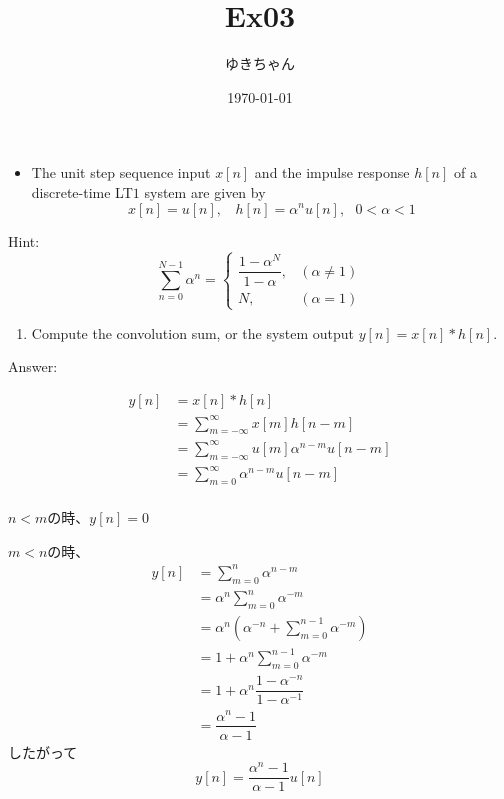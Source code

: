 \documentclass[a4paper,16pt]{jsarticle}
\title{Ex03}
\author{ゆきちゃん}
\date{\today}
\begin{document}
\maketitle

\begin{itemize}
	\item The unit step sequence input $x[n]$ and the impulse response $h[n]$ of a discrete-time LT$1$ system are given by
	\begin{equation}
		x[n] = u[n],~~~~h[n] = \alpha^n u[n],~~~0<\alpha<1
	\end{equation}
\end{itemize}

Hint:
\begin{equation}
	\sum_{n=0}^{N-1} \alpha^n =
	\begin{cases}
		\dfrac{1-\alpha^N}{1-\alpha}, & (\alpha \neq 1) \\
		N, & (\alpha = 1)
	\end{cases}
\end{equation}

\begin{enumerate}
	\item Compute the convolution sum, or the system output $y[n] = x[n]*h[n]$.
\end{enumerate}

Answer:

\begin{align}
	y[n] &= x[n]*h[n] \\
	&= \sum_{m = -\infty}^\infty x[m]h[n-m] \\
	&= \sum_{m = -\infty}^\infty u[m]\alpha^{n-m}u[n-m] \\
	&= \sum_{m = 0}^\infty \alpha^{n-m}u[n-m] \\
\end{align}

$n < m$の時、$y[n] = 0$

$m < n$の時、
\begin{align}
	y[n] &= \sum_{m=0}^{n} \alpha^{n-m} \\
	&= \alpha^n\sum_{m=0}^{n} \alpha^{-m} \\
	&= \alpha^n\left(\alpha^{-n}+\sum_{m=0}^{n-1}\alpha^{-m}\right) \\
	&= 1 + \alpha^n \sum_{m=0}^{n-1}\alpha^{-m} \\
	&= 1 + \alpha^n \dfrac{1-\alpha^{-n}}{1-\alpha^{-1}} \\
	&= \dfrac{\alpha^n -1}{\alpha -1}
\end{align}
したがって
\begin{equation}
	y[n] = \dfrac{\alpha^n -1}{\alpha -1}u[n]
\end{equation}
\end{document}
